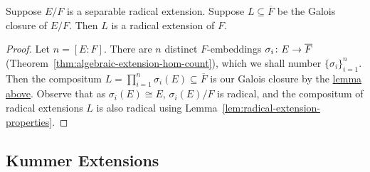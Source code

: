 \begin{proposition}\label{prop:galois-closure-radical}
    Suppose \(E/F\) is a separable radical extension.
    Suppose \(L \subseteq \overline{F}\) be the Galois closure of \(E/F\).
    Then \(L\) is a radical extension of \(F\).
\end{proposition}
\begin{proof}
    Let \(n = [E:F]\).
    There are \(n\) distinct \(F\)-embeddings \(\sigma_i\colon E\to\overline{F}\)
    (Theorem~\ref{thm:algebraic-extension-hom-count}),
    which we shall number \({\{\sigma_i\}}_{i=1}^n\).
    Then the compositum \(L = \prod_{i=1}^n \sigma_i(E) \subseteq \overline{F}\) is our Galois closure
    by the \hyperref[lem:compositum-galois-closure]{lemma above}.
    Observe that as \(\sigma_i(E) \cong E\), \(\sigma_i(E)/F\) is radical,
    and the compositum of radical extensions \(L\) is also radical
    using Lemma~\ref{lem:radical-extension-properties}.
\end{proof}


\subsection*{Kummer Extensions}

